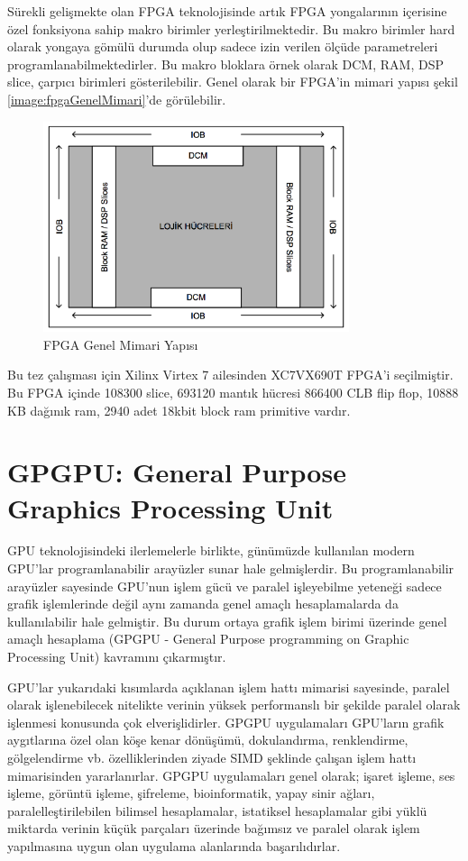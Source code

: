 Sürekli gelişmekte olan FPGA teknolojisinde artık FPGA yongalarının içerisine özel fonksiyona sahip makro birimler yerleştirilmektedir. Bu makro birimler hard olarak yongaya gömülü durumda olup sadece izin verilen ölçüde parametreleri programlanabilmektedirler. Bu makro bloklara örnek olarak DCM, RAM, DSP slice, çarpıcı birimleri gösterilebilir. Genel olarak bir FPGA’in mimari yapısı şekil \ref{image:fpgaGenelMimari}’de görülebilir.
\begin{figure}[h]
\centering
\shorthandoff{=}
\includegraphics[width=0.8\textwidth]{gorsel/fpgaGenelMimari.png}
\shorthandoff{=}
\caption{FPGA Genel Mimari Yapısı}
\label{fpgaGenelMimari}
\end{figure}
Bu tez çalışması için Xilinx Virtex 7 ailesinden XC7VX690T FPGA’i seçilmiştir. Bu FPGA içinde 108300 slice, 693120 mantık hücresi 866400 CLB flip flop, 10888 KB dağınık ram, 2940 adet 18kbit block ram primitive vardır. \par

\section{GPGPU: General Purpose Graphics Processing Unit}

GPU teknolojisindeki ilerlemelerle birlikte, günümüzde kullanılan modern GPU’lar programlanabilir arayüzler sunar hale gelmişlerdir. Bu programlanabilir arayüzler sayesinde GPU’nun işlem gücü ve paralel işleyebilme yeteneği sadece grafik işlemlerinde değil aynı zamanda genel amaçlı hesaplamalarda da kullanılabilir hale gelmiştir. Bu durum ortaya grafik işlem birimi üzerinde genel amaçlı hesaplama (GPGPU - General Purpose programming on Graphic Processing Unit) kavramını çıkarmıştır. \par
GPU’lar yukarıdaki kısımlarda açıklanan işlem hattı mimarisi sayesinde, paralel olarak işlenebilecek nitelikte verinin yüksek performanslı bir şekilde paralel olarak işlenmesi konusunda çok elverişlidirler. GPGPU uygulamaları GPU’ların grafik aygıtlarına özel olan köşe kenar dönüşümü, dokulandırma, renklendirme, gölgelendirme vb. özelliklerinden ziyade SIMD şeklinde çalışan işlem hattı mimarisinden yararlanırlar. GPGPU uygulamaları genel olarak; işaret işleme, ses işleme, görüntü işleme, şifreleme, bioinformatik, yapay sinir ağları, paralelleştirilebilen bilimsel hesaplamalar, istatiksel hesaplamalar gibi yüklü miktarda verinin küçük parçaları üzerinde bağımsız ve paralel olarak işlem yapılmasına uygun olan uygulama alanlarında başarılıdırlar. \cite{ertanYildizThesis}\par

